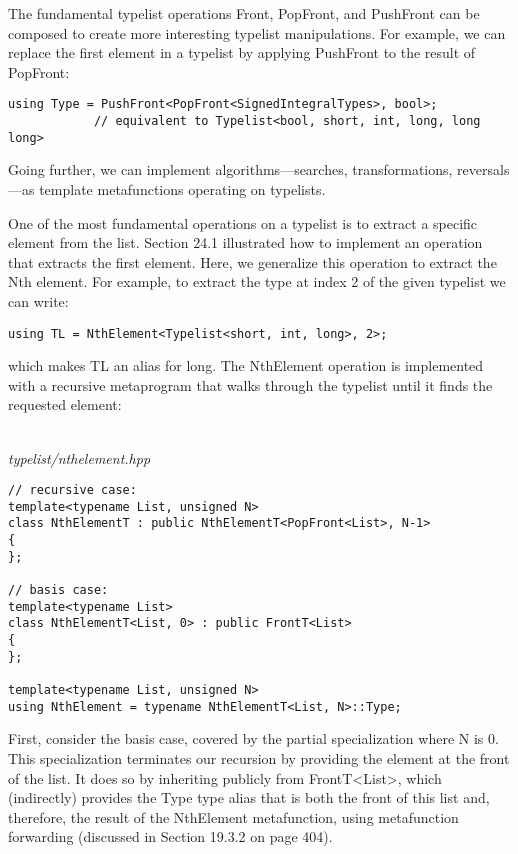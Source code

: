 
The fundamental typelist operations Front, PopFront, and PushFront can be composed to create more interesting typelist manipulations. For example, we can replace the first element in a typelist by applying PushFront to the result of PopFront:

\begin{lstlisting}[style=styleCXX]
using Type = PushFront<PopFront<SignedIntegralTypes>, bool>;
			// equivalent to Typelist<bool, short, int, long, long long>
\end{lstlisting}

Going further, we can implement algorithms—searches, transformations, reversals—as template metafunctions operating on typelists.


One of the most fundamental operations on a typelist is to extract a specific element from the list. Section 24.1 illustrated how to implement an operation that extracts the first element. Here, we generalize this operation to extract the Nth element. For example, to extract the type at index 2 of the given typelist we can write:

\begin{lstlisting}[style=styleCXX]
using TL = NthElement<Typelist<short, int, long>, 2>;
\end{lstlisting}

which makes TL an alias for long. The NthElement operation is implemented with a recursive metaprogram that walks through the typelist until it finds the requested element:

\hspace*{\fill} \\ %
\noindent
\textit{typelist/nthelement.hpp}
\begin{lstlisting}[style=styleCXX]
// recursive case:
template<typename List, unsigned N>
class NthElementT : public NthElementT<PopFront<List>, N-1>
{
};

// basis case:
template<typename List>
class NthElementT<List, 0> : public FrontT<List>
{
};

template<typename List, unsigned N>
using NthElement = typename NthElementT<List, N>::Type;
\end{lstlisting}

First, consider the basis case, covered by the partial specialization where N is 0. This specialization terminates our recursion by providing the element at the front of the list. It does so by inheriting publicly from FrontT<List>, which (indirectly) provides the Type type alias that is both the front of this list and, therefore, the result of the NthElement metafunction, using metafunction forwarding (discussed in Section 19.3.2 on page 404).

